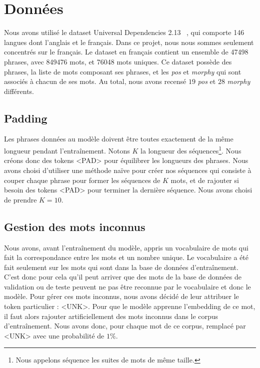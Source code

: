\documentclass[a4paper]{article}
\begin{document}
\section{Données}

Nous avons utilisé le dataset Universal Dependencies 2.13 ~\cite{11234/1-5287}, qui comporte 146 langues dont l'anglais
et le français. Dans ce projet, nous nous sommes seulement concentrés sur le français.
Le dataset en français contient un ensemble de 47498 phrases, avec 849476 mots, et 76048 mots uniques.
Ce dataset possède des phrases, la liste de mots composant ses phrases,
et les \textit{pos} et \textit{morphy} qui sont associés à chacun de ses mots. Au total, nous avons recensé $19$ \textit{pos} et 
$28$ \textit{morphy} différents.

\subsection{Padding}

Les phrases données au modèle doivent être toutes exactement de la même longueur pendant l'entraînement. 
Notons $K$ la longueur des séquences\footnote{Nous appelons séquence les suites de mots de même taille.}. Nous créons donc des 
tokens <PAD> pour équilibrer les longueurs des phrases.
Nous avons choisi d'utiliser une méthode naïve pour créer nos séquences qui consiste à couper chaque phrase pour former les séquences
de $K$ mots, et de rajouter si besoin des tokens <PAD> pour terminer la dernière séquence. Nous avons choisi de prendre $K=10$.

\subsection{Gestion des mots inconnus}

Nous avons, avant l'entraînement du modèle, appris un vocabulaire de mots qui fait la correspondance entre les mots et un nombre unique.
Le vocabulaire a été fait seulement sur les mots qui sont dans la base de données d'entraînement. C'est donc pour cela qu'il peut
arriver que des mots de la base de données de validation ou de teste peuvent ne pas être reconnue par le vocabulaire et donc le modèle.
Pour gérer ces mots inconnus, nous avons décidé de leur attribuer le token particulier : <UNK>. Pour que le modèle
apprenne l'embedding de ce mot, il faut alors rajouter artificiellement des mots inconnus dans le corpus d'entraînement. Nous avons
donc, pour chaque mot de ce corpus, remplacé par <UNK> avec une probabilité de $1\%$.
\end{document}

